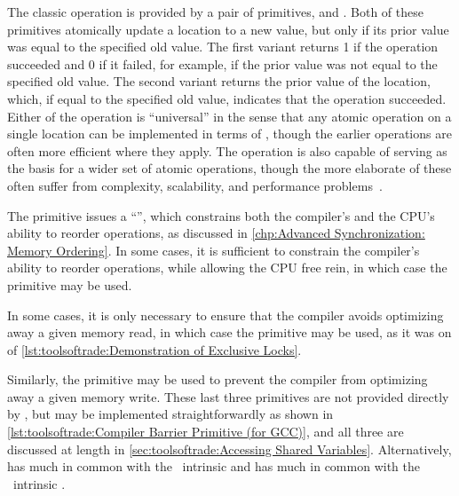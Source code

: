 The classic  operation is provided by a pair of
primitives,  and
.
Both of these primitives atomically update a location to a new value,
but only if its prior value was equal to the specified old value.
The first variant returns 1 if the operation succeeded and 0 if it
failed, for example, if the prior value was not equal to the specified
old value.
The second variant returns the prior value of the location, which, if
equal to the specified old value, indicates that the operation succeeded.
Either of the  operation is ``universal'' in the sense
that any atomic operation on a single location can be implemented in
terms of , though the earlier operations are often
more efficient where they apply.
The  operation is also capable of serving as the basis
for a wider set of atomic operations, though the more elaborate of
these often suffer from complexity, scalability, and performance
problems~\cite{MauriceHerlihy90a}.

\QuickQuizEnd

The  primitive issues a ``'',
which constrains both the compiler's and the CPU's ability to reorder
operations, as discussed in
\cref{chp:Advanced Synchronization: Memory Ordering}.
In some cases, it is sufficient to constrain the compiler's ability
to reorder operations, while allowing the CPU free rein, in which
case the  primitive may be used.
\begin{fcvref}
In some cases, it is only necessary to ensure that the compiler
avoids optimizing away a given memory read, in which case the
 primitive may be used, as it was on  of
\cref{lst:toolsoftrade:Demonstration of Exclusive Locks}.
\end{fcvref}
Similarly, the  primitive may be used to prevent the
compiler from optimizing away a given memory write.
These last three primitives are not provided directly by \GCC,
but may be implemented straightforwardly as shown in
\cref{lst:toolsoftrade:Compiler Barrier Primitive (for GCC)},
and all three are discussed at length in
\cref{sec:toolsoftrade:Accessing Shared Variables}.
Alternatively,  has much in common with
the \GCC\  intrinsic
and  has much in common with the \GCC\ 
intrinsic .

